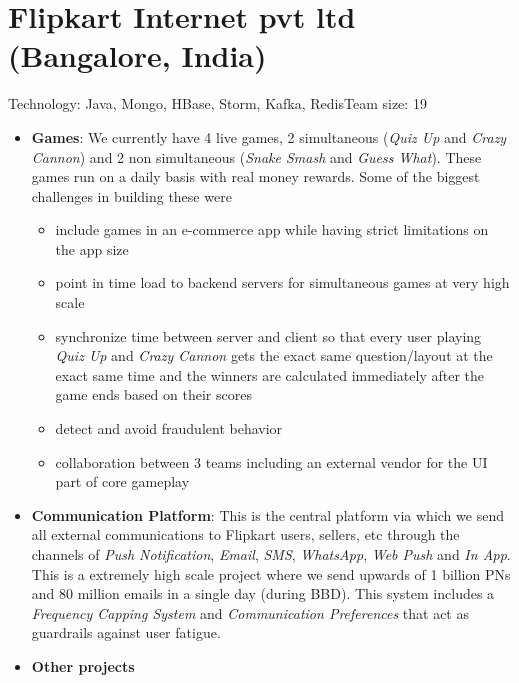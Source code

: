 \documentclass[11pt,a4paper,sans]{moderncv} %
\begin{document}
\newpage{}
\section{Flipkart Internet pvt ltd (Bangalore, India)}
         {Technology: Java, Mongo, HBase, Storm, Kafka, Redis}{Team size: 19}
         {\begin{itemize}
            \item \textbf{Games}: We currently have 4 live games, 2 simultaneous (\textit{Quiz Up} and \textit{Crazy Cannon}) and 2 non simultaneous (\textit{Snake Smash} and \textit{Guess What}). These games run on a daily basis with real money rewards. Some of the biggest challenges in building these were
              \begin{itemize}
                \item include games in an e-commerce app while having strict limitations on the app size
                \item point in time load to backend servers for simultaneous games at very high scale
                \item synchronize time between server and client so that every user playing \textit{Quiz Up} and \textit{Crazy Cannon} gets the exact same question/layout at the exact same time and the winners are calculated immediately after the game ends based on their scores
                \item detect and avoid fraudulent behavior
                \item collaboration between 3 teams including an external vendor for the UI part of core gameplay
              \end{itemize}
            \item \textbf{Communication Platform}: This is the central platform via which we send all external communications to Flipkart users, sellers, etc through the channels of \textit{Push Notification}, \textit{Email},  \textit{SMS}, \textit{WhatsApp}, \textit{Web Push} and \textit{In App}. This is a extremely high scale project where we send upwards of 1 billion PNs and 80 million emails in a single day (during BBD). This system includes a \textit{Frequency Capping System} and \textit{Communication Preferences} that act as guardrails against user fatigue.
            \item \textbf{Other projects}

\end{itemize}}
\end{document}
